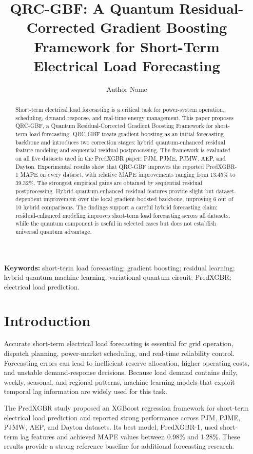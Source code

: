 \documentclass[11pt]{article}
\title{QRC-GBF: A Quantum Residual-Corrected Gradient Boosting Framework for Short-Term Electrical Load Forecasting}
\author{Author Name}
\date{}
\begin{document}
\maketitle

\begin{abstract}
Short-term electrical load forecasting is a critical task for power-system operation, scheduling, demand response, and real-time energy management. This paper proposes QRC-GBF, a Quantum Residual-Corrected Gradient Boosting Framework for short-term load forecasting. QRC-GBF treats gradient boosting as an initial forecasting backbone and introduces two correction stages: hybrid quantum-enhanced residual feature modeling and sequential residual postprocessing. The framework is evaluated on all five datasets used in the PredXGBR paper: PJM, PJME, PJMW, AEP, and Dayton. Experimental results show that QRC-GBF improves the reported PredXGBR-1 MAPE on every dataset, with relative MAPE improvements ranging from 13.45\% to 39.32\%. The strongest empirical gains are obtained by sequential residual postprocessing. Hybrid quantum-enhanced residual features provide slight but dataset-dependent improvement over the local gradient-boosted backbone, improving 6 out of 10 hybrid comparisons. The findings support a careful hybrid forecasting claim: residual-enhanced modeling improves short-term load forecasting across all datasets, while the quantum component is useful in selected cases but does not establish universal quantum advantage.
\end{abstract}

\textbf{Keywords:} short-term load forecasting; gradient boosting; residual learning; hybrid quantum machine learning; variational quantum circuit; PredXGBR; electrical load prediction.

\section{Introduction}
Accurate short-term electrical load forecasting is essential for grid operation, dispatch planning, power-market scheduling, and real-time reliability control. Forecasting errors can lead to inefficient reserve allocation, higher operating costs, and unstable demand-response decisions. Because load demand contains daily, weekly, seasonal, and regional patterns, machine-learning models that exploit temporal lag information are widely used for this task.

The PredXGBR study proposed an XGBoost regression framework for short-term electrical load prediction and reported strong performance across PJM, PJME, PJMW, AEP, and Dayton datasets. Its best model, PredXGBR-1, used short-term lag features and achieved MAPE values between 0.98\% and 1.28\%. These results provide a strong reference baseline for additional forecasting research.
\end{document}

